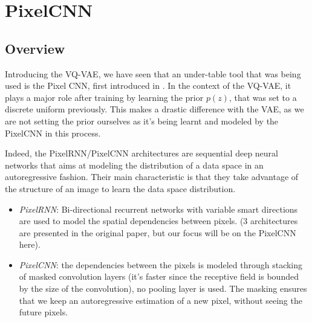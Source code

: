 \section{PixelCNN}

\subsection{Overview}

Introducing the VQ-VAE, we have seen that an under-table tool that was being used is the Pixel CNN,
first introduced in \cite{pixel_cnn_paper}.
In the context of the VQ-VAE, it plays a major role after training by learning the prior $p(z)$, that was set
to a discrete uniform previously.
This makes a drastic difference with the VAE, as we are not setting the prior ourselves as it's being learnt and modeled by the PixelCNN in this process.
\medskip

Indeed, the PixelRNN/PixelCNN architectures are sequential deep neural networks that aims at modeling the distribution of a data space
in an autoregressive fashion.
Their main characteristic is that they take advantage of the structure of an image to learn the data space distribution.
\begin{itemize}
    \item \textit{PixelRNN}: Bi-directional recurrent networks with variable smart directions are used to model the spatial dependencies between pixels.
    (3 architectures are presented in the original paper, but our focus will be on the PixelCNN here).

    \item \textit{PixelCNN}: the dependencies between the pixels is modeled through stacking of masked convolution layers (it's faster since the receptive field is bounded by the size of the convolution), no pooling layer is used.
    The masking ensures that we keep an autoregressive estimation of a new pixel, without seeing the future pixels.
\end{itemize}


